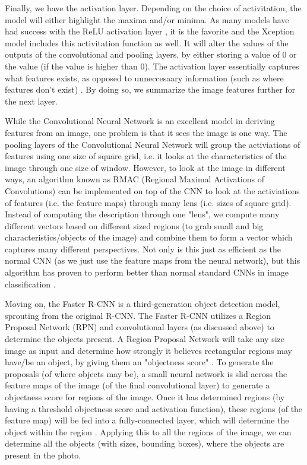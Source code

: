 \documentclass[10pt,twocolumn]{article}
\begin{document}
Finally, we have the activation layer. Depending on the choice of activitation, the model will either highlight the maxima and/or minima. As many models have had success with the ReLU activation layer \cite{}, it is the favorite and the Xception model includes this activitation function as well. It will alter the values of the outputs of the convolutional and pooling layers, by either storing a value of 0 or the value (if the value is higher than 0). The activation layer essentially captures what features exists, as opposed to unneccesaary information (such as where features don't exist) \cite{}. By doing so, we summarize the image features further for the next layer.

While the Convolutional Neural Network is an excellent model in deriving features from an image, one problem is that it sees the image is one way. The pooling layers of the Convolutional Neural Network will group the activiations of features using one size of square grid, i.e. it looks at the characteristics of the image through one size of window. However, to look at the image in different ways, an algorithm known as RMAC (Regional Maximal Activations of Convolutions) can be implemented on top of the CNN to look at the activiations of features (i.e. the feature maps) through many lens (i.e. sizes of square grid). Instead of computing the description through one "lens", we compute many different vectors based on different sized regions (to grab small and big characteristics/objects of the image) and combine them to form a vector which captures many different perspectives. Not only is this just as efficient as the normal CNN (as we just use the feature maps from the neural network), but this algorithm has proven to perform better than normal standard CNNs in image classification \cite{Tolias2016 TODO}.

Moving on, the Faster R-CNN is a third-generation object detection model, sprouting from the original R-CNN. The Faster R-CNN utilizes a Region Proposal Network (RPN) and convolutional layers (as discussed above) to determine the objects present. A Region Proposal Network will take any size image as input and determine how strongly it believes rectangular regions may have/be an object, by giving them an "objectness score" \cite{Ren2016 TODO}. To generate the proposals (of where objects may be), a small neural network is slid across the feature maps of the image (of the final convolutional layer) to generate a objectness score for regions of the image. Once it has determined regions (by having a threshold objectness score and activation function), these regions (of the feature map) will be fed into a fully-connected layer, which will determine the object within the region \cite{Ren2016 TODO}. Applying this to all the regions of the image, we can determine all the objects (with sizes, bounding boxes), where the objects are present in the photo.
\end{document}
